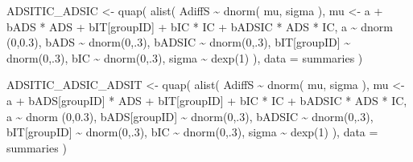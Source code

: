 \documentclass[
  10pt,
  dvipsnames,enabledeprecatedfontcommands]{scrartcl}
\newenvironment{Shaded}{\begin{snugshade}}{\end{snugshade}}
\newcommand{\AttributeTok}[1]{\textcolor[rgb]{0.77,0.63,0.00}{#1}}
\newcommand{\DecValTok}[1]{\textcolor[rgb]{0.00,0.00,0.81}{#1}}
\newcommand{\FloatTok}[1]{\textcolor[rgb]{0.00,0.00,0.81}{#1}}
\newcommand{\FunctionTok}[1]{\textcolor[rgb]{0.00,0.00,0.00}{#1}}
\newcommand{\NormalTok}[1]{#1}
\newcommand{\OtherTok}[1]{\textcolor[rgb]{0.56,0.35,0.01}{#1}}
\newcommand{\SpecialCharTok}[1]{\textcolor[rgb]{0.00,0.00,0.00}{#1}}
\begin{document}
\begin{Shaded}
\begin{Highlighting}[]
\NormalTok{ADSITIC\_ADSIC }\OtherTok{\textless{}{-}} \FunctionTok{quap}\NormalTok{(}
  \FunctionTok{alist}\NormalTok{(}
\NormalTok{    AdiffS }\SpecialCharTok{\textasciitilde{}} \FunctionTok{dnorm}\NormalTok{( mu, sigma ),}
\NormalTok{    mu }\OtherTok{\textless{}{-}}\NormalTok{ a }\SpecialCharTok{+}\NormalTok{ bADS }\SpecialCharTok{*}\NormalTok{ ADS }\SpecialCharTok{+}\NormalTok{  bIT[groupID] }\SpecialCharTok{+}\NormalTok{ bIC }\SpecialCharTok{*}\NormalTok{ IC }\SpecialCharTok{+}\NormalTok{ bADSIC }\SpecialCharTok{*}\NormalTok{ ADS }\SpecialCharTok{*}\NormalTok{ IC,}
\NormalTok{    a }\SpecialCharTok{\textasciitilde{}} \FunctionTok{dnorm}\NormalTok{ (}\DecValTok{0}\NormalTok{,}\FloatTok{0.3}\NormalTok{),}
\NormalTok{    bADS }\SpecialCharTok{\textasciitilde{}} \FunctionTok{dnorm}\NormalTok{(}\DecValTok{0}\NormalTok{,.}\DecValTok{3}\NormalTok{),}
\NormalTok{    bADSIC }\SpecialCharTok{\textasciitilde{}} \FunctionTok{dnorm}\NormalTok{(}\DecValTok{0}\NormalTok{,.}\DecValTok{3}\NormalTok{),}
\NormalTok{    bIT[groupID] }\SpecialCharTok{\textasciitilde{}} \FunctionTok{dnorm}\NormalTok{(}\DecValTok{0}\NormalTok{,.}\DecValTok{3}\NormalTok{),}
\NormalTok{    bIC }\SpecialCharTok{\textasciitilde{}} \FunctionTok{dnorm}\NormalTok{(}\DecValTok{0}\NormalTok{,.}\DecValTok{3}\NormalTok{),}
\NormalTok{    sigma  }\SpecialCharTok{\textasciitilde{}} \FunctionTok{dexp}\NormalTok{(}\DecValTok{1}\NormalTok{)}
\NormalTok{  ), }
  \AttributeTok{data =}\NormalTok{ summaries}
\NormalTok{)}


\NormalTok{ADSITIC\_ADSIC\_ADSIT }\OtherTok{\textless{}{-}} \FunctionTok{quap}\NormalTok{(}
  \FunctionTok{alist}\NormalTok{(}
\NormalTok{    AdiffS }\SpecialCharTok{\textasciitilde{}} \FunctionTok{dnorm}\NormalTok{( mu, sigma ),}
\NormalTok{    mu }\OtherTok{\textless{}{-}}\NormalTok{ a }\SpecialCharTok{+}\NormalTok{ bADS[groupID] }\SpecialCharTok{*}\NormalTok{ ADS }\SpecialCharTok{+}\NormalTok{  bIT[groupID] }\SpecialCharTok{+}\NormalTok{ bIC }\SpecialCharTok{*}\NormalTok{ IC }\SpecialCharTok{+}\NormalTok{ bADSIC }\SpecialCharTok{*}\NormalTok{ ADS }\SpecialCharTok{*}\NormalTok{ IC,}
\NormalTok{    a }\SpecialCharTok{\textasciitilde{}} \FunctionTok{dnorm}\NormalTok{ (}\DecValTok{0}\NormalTok{,}\FloatTok{0.3}\NormalTok{),}
\NormalTok{    bADS[groupID] }\SpecialCharTok{\textasciitilde{}} \FunctionTok{dnorm}\NormalTok{(}\DecValTok{0}\NormalTok{,.}\DecValTok{3}\NormalTok{),}
\NormalTok{    bADSIC }\SpecialCharTok{\textasciitilde{}} \FunctionTok{dnorm}\NormalTok{(}\DecValTok{0}\NormalTok{,.}\DecValTok{3}\NormalTok{),}
\NormalTok{    bIT[groupID] }\SpecialCharTok{\textasciitilde{}} \FunctionTok{dnorm}\NormalTok{(}\DecValTok{0}\NormalTok{,.}\DecValTok{3}\NormalTok{),}
\NormalTok{    bIC }\SpecialCharTok{\textasciitilde{}} \FunctionTok{dnorm}\NormalTok{(}\DecValTok{0}\NormalTok{,.}\DecValTok{3}\NormalTok{),}
\NormalTok{    sigma  }\SpecialCharTok{\textasciitilde{}} \FunctionTok{dexp}\NormalTok{(}\DecValTok{1}\NormalTok{)}
\NormalTok{  ), }
  \AttributeTok{data =}\NormalTok{ summaries}
\NormalTok{)}



\end{Highlighting}
\end{Shaded}
\end{document}
